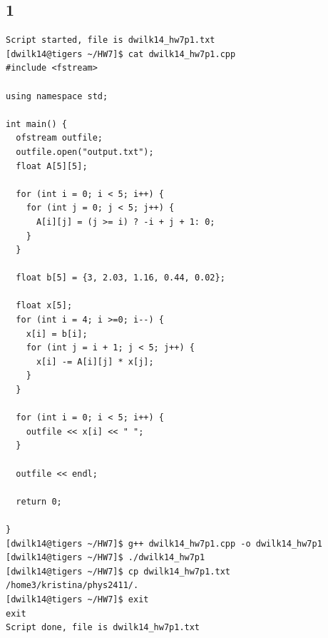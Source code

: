 \documentclass{article}
\begin{document}
\subsection*{1}
\begin{verbatim}
Script started, file is dwilk14_hw7p1.txt
[dwilk14@tigers ~/HW7]$ cat dwilk14_hw7p1.cpp
#include <fstream>

using namespace std;

int main() {
  ofstream outfile;
  outfile.open("output.txt");
  float A[5][5];

  for (int i = 0; i < 5; i++) {
    for (int j = 0; j < 5; j++) {
      A[i][j] = (j >= i) ? -i + j + 1: 0;
    }
  }

  float b[5] = {3, 2.03, 1.16, 0.44, 0.02};

  float x[5];
  for (int i = 4; i >=0; i--) {
    x[i] = b[i];
    for (int j = i + 1; j < 5; j++) {
      x[i] -= A[i][j] * x[j];
    }
  }

  for (int i = 0; i < 5; i++) {
    outfile << x[i] << " ";
  }

  outfile << endl;

  return 0;

}
[dwilk14@tigers ~/HW7]$ g++ dwilk14_hw7p1.cpp -o dwilk14_hw7p1
[dwilk14@tigers ~/HW7]$ ./dwilk14_hw7p1
[dwilk14@tigers ~/HW7]$ cp dwilk14_hw7p1.txt /home3/kristina/phys2411/.
[dwilk14@tigers ~/HW7]$ exit
exit
Script done, file is dwilk14_hw7p1.txt
\end{verbatim}
\end{document}

